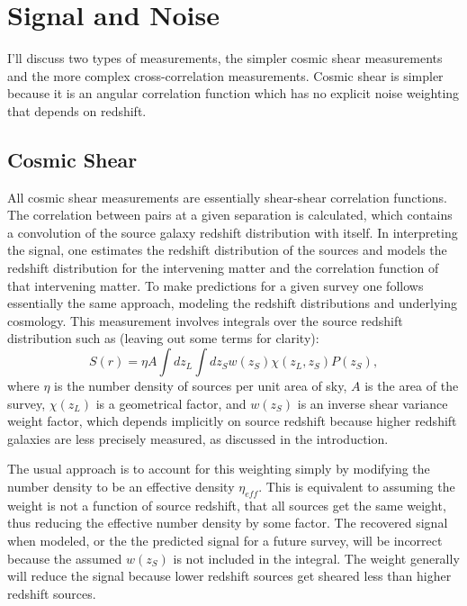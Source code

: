 \documentclass[12pt,preprint]{aastex}
\begin{document}
\section{Signal and Noise} \label{sec:SignalAndNoise}

I'll discuss two types of measurements, the simpler cosmic shear measurements
and the more complex cross-correlation measurements.  Cosmic shear is simpler
because it is an angular correlation function which has no explicit noise
weighting that depends on redshift.

\subsection{Cosmic Shear}

All cosmic shear measurements are essentially shear-shear correlation
functions.  The correlation between pairs at a given separation is calculated,
which contains a convolution of the source galaxy redshift distribution with
itself.  In interpreting the signal, one estimates the redshift distribution of
the sources and models the redshift distribution for the intervening matter and
the correlation function of that intervening matter.  To make predictions for a
given survey one follows essentially the same approach, modeling the redshift
distributions and underlying cosmology.  This measurement involves integrals
over the source redshift distribution such as (leaving out some terms for
clarity):
\begin{equation}
S(r) = \eta A \int dz_L \int dz_S w(z_S) \chi(z_L,z_S) P(z_S),
\end{equation} 
where $\eta$ is the number density of sources per unit area of sky, $A$ is the
area of the survey, $\chi(z_L)$ is a geometrical factor, and $w(z_S)$ is an
inverse shear variance weight factor, which depends implicitly on source
redshift because higher redshift galaxies are less precisely measured, as
discussed in the introduction.   

The usual approach is to account for this weighting simply by modifying the
number density to be an effective density $\eta_{eff}$.  This is equivalent to
assuming the weight is not a function of source redshift, that all sources get
the same weight, thus reducing the effective number density by some factor.
The recovered signal when modeled, or the the predicted signal for a future
survey, will be incorrect because the assumed $w(z_S)$ is not included in the
integral. The weight generally will reduce the signal because lower redshift
sources get sheared less than higher redshift sources.
\end{document}
